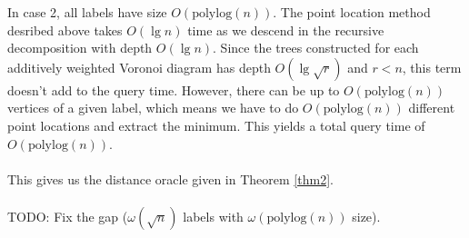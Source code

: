 In case 2, all labels have size $O(\text{polylog}(n))$. The point location method desribed
above takes $O(\lg n)$ time as we descend in the recursive decomposition with depth
$O(\lg n)$. Since the trees constructed for each additively weighted Voronoi diagram has
depth $O(\lg \sqrt{r})$ and $r<n$, this term doesn't add to the query time. However,
there can be up to $O(\text{polylog}(n))$ vertices of a given label, which means we have
to do $O(\text{polylog}(n))$ different point locations and extract the minimum. This
yields a total query time of $O(\text{polylog}(n))$. \\
\\
This gives us the distance oracle given in Theorem \ref{thm2}. \\
\\
TODO: Fix the gap ($\omega(\sqrt{n})$ labels with $\omega(\text{polylog}(n))$ size).

